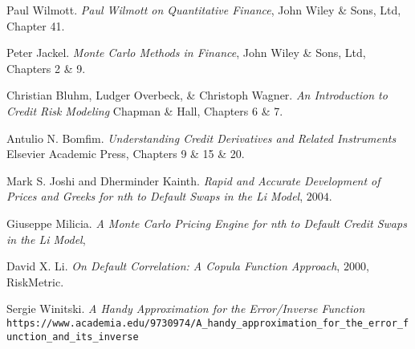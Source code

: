 \documentclass[a4paper,12pt]{article}
\begin{document}
\medskip

\begin{thebibliography}{20}
Paul Wilmott.
\textit{Paul Wilmott on Quantitative Finance},
John Wiley \& Sons, Ltd, Chapter 41.

Peter Jackel.
\textit{Monte Carlo Methods in Finance},
John Wiley \& Sons, Ltd, Chapters 2 \& 9.

Christian Bluhm, Ludger Overbeck, \& Christoph Wagner.
\textit{An Introduction to Credit Risk Modeling}
Chapman \& Hall, Chapters 6 \& 7.

Antulio N. Bomfim.
\textit{Understanding Credit Derivatives and Related Instruments}
Elsevier Academic Press, Chapters 9 \& 15 \& 20. 

Mark S. Joshi and Dherminder Kainth.
\textit{Rapid and Accurate Development of Prices and Greeks for nth to Default Swaps in the Li Model}, \(2004\).

Giuseppe Milicia.
\textit{A Monte Carlo Pricing Engine for nth to Default Credit Swaps in the Li Model},

David X. Li.
\textit{On Default Correlation: A Copula Function Approach}, \(2000\), RiskMetric. 

Sergie Winitski.
\textit{A Handy Approximation for the Error/Inverse Function}
\texttt{https://www.academia.edu/9730974/A\_handy\_approximation\_for\_the\_error\_function\_and\_its\_inverse}

\end{thebibliography}
\end{document}
